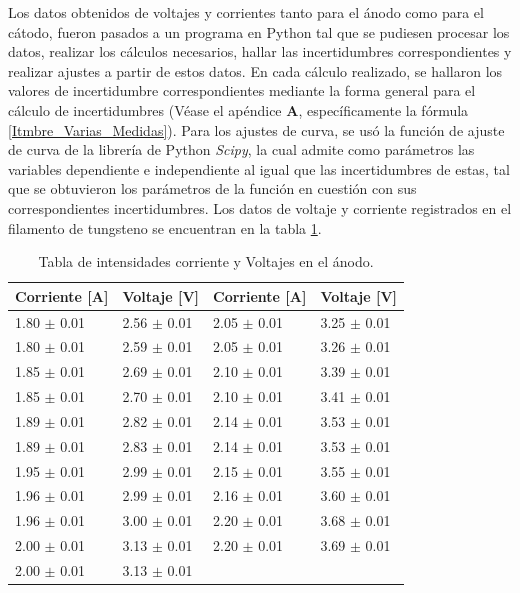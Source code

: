 \documentclass[%
 reprint,
 amsmath,amssymb,
 aps,
]{revtex4-2}
\begin{document}
Los datos obtenidos de voltajes y corrientes tanto para el ánodo como para el cátodo, fueron pasados a un programa en Python tal que se pudiesen procesar los datos, realizar los cálculos necesarios, hallar las incertidumbres correspondientes y realizar ajustes a partir de estos datos. En cada cálculo realizado, se hallaron los valores de incertidumbre correspondientes mediante la forma general para el cálculo de incertidumbres (Véase el apéndice $\boldsymbol{A}$, específicamente la fórmula \ref{Itmbre_Varias_Medidas}). Para los ajustes de curva, se usó la función de ajuste de curva de la librería de Python \textit{Scipy}, la cual admite como parámetros las variables dependiente e independiente al igual que las incertidumbres de estas, tal que se obtuvieron los parámetros de la función en cuestión con sus correspondientes incertidumbres. Los datos de voltaje y corriente registrados en el filamento de tungsteno se encuentran en la tabla \ref{tab: V vs I filamento}.

\begin{table}[H]
    \centering
    \begin{tabular}{l|l||l|l}
        \toprule
        \toprule
        Corriente [A] & Voltaje [V] & Corriente [A] & Voltaje [V]\\
        \midrule
        1.80 $\pm$ 0.01  &  2.56 $\pm$ 0.01  & 2.05 $\pm$ 0.01  &  3.25 $\pm$ 0.01  \\
        1.80 $\pm$ 0.01  &  2.59 $\pm$ 0.01  & 2.05 $\pm$ 0.01  &  3.26 $\pm$ 0.01 \\
        1.85 $\pm$ 0.01  &  2.69 $\pm$ 0.01  & 2.10 $\pm$ 0.01  &  3.39 $\pm$ 0.01 \\
        1.85 $\pm$ 0.01  &  2.70 $\pm$ 0.01  & 2.10 $\pm$ 0.01  &  3.41 $\pm$ 0.01\\
        1.89 $\pm$ 0.01  &  2.82 $\pm$ 0.01  & 2.14 $\pm$ 0.01  &  3.53 $\pm$ 0.01 \\
        1.89 $\pm$ 0.01  &  2.83 $\pm$ 0.01  & 2.14 $\pm$ 0.01  &  3.53 $\pm$ 0.01 \\
        1.95 $\pm$ 0.01  &  2.99 $\pm$ 0.01  & 2.15 $\pm$ 0.01  &  3.55 $\pm$ 0.01\\
        1.96 $\pm$ 0.01  &  2.99 $\pm$ 0.01  & 2.16 $\pm$ 0.01  &  3.60 $\pm$ 0.01\\
        1.96 $\pm$ 0.01  &  3.00 $\pm$ 0.01  &  2.20 $\pm$ 0.01  &  3.68 $\pm$ 0.01 \\
        2.00 $\pm$ 0.01  &  3.13 $\pm$ 0.01  & 2.20 $\pm$ 0.01  &  3.69 $\pm$ 0.01  \\
        2.00 $\pm$ 0.01  &  3.13 $\pm$ 0.01  & & \\
        \bottomrule
        \bottomrule

    \end{tabular}
    \caption{Tabla de intensidades corriente y Voltajes en el ánodo.}
    \label{tab: V vs I filamento}
\end{table}
\end{document}
